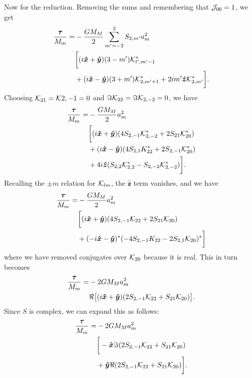 \documentclass[aps,twocolumn,secnumarabic,balancelastpage,amsmath,amssymb,nofootinbib,floatfix]{revtex4-1}
\begin{document}
Now for the reduction. Removing the sums and remembering that $\mathcal{J}_{00}=1$, we get
\begin{equation*}
\begin{aligned}
\frac{\bm \tau}{M_m} = &-\frac{GM_M}{2} \sum_{m'=-2}^2 S_{2,m'}a_m^2\\
&\bigg[(i\bm{\hat x} + \bm{\hat y})(3-m')\mathcal{K}^*_{l',m'-1}\\
&+(i\bm{\hat x}-\bm{\hat y})(3+m')\mathcal{K}^*_{2,m'+1}+2im'\bm{\hat z} \mathcal{K}^*_{2,m'}\bigg].
\end{aligned}
\end{equation*}
Choosing $\mathcal{K}_{21}=\mathcal{K}{2,-1}=0$ and $\Im \mathcal{K}_{22}=\Im \mathcal{K}_{2,-2}=0$, we have
\begin{equation*}
\begin{aligned}
\frac{\bm \tau}{M_m} = &-\frac{GM_M}{2} a_m^2\\
&\bigg[(i\bm{\hat x} + \bm{\hat y})(4S_{2,-1}\mathcal{K}^*_{2,-2}+2S_{21}\mathcal{K}^*_{20})\\
&+(i\bm{\hat x}-\bm{\hat y})(4S_{2,1}K^*_{22}+2S_{2,-1}\mathcal{K}^*_{20})\\
&+4i\bm{\hat z} (S_{2,2}\mathcal{K}^*_{2,2}-S_{2,-2}\mathcal{K}^*_{2,-2})\bigg].
\end{aligned}
\end{equation*}
Recalling the $\pm m$ relation for $\mathcal{K}_{lm}$, the $\bm{\hat z}$ term vanishes, and we have
\begin{equation*}
\begin{aligned}
\frac{\bm \tau}{M_m} = &-\frac{GM_M}{2}a_m^2\\
&\bigg[(i\bm{\hat x} + \bm{\hat y})(4S_{2,-1}\mathcal{K}_{22}+2S_{21}\mathcal{K}_{20})\\
&+(-i\bm{\hat x}-\bm{\hat y})^*(-4S_{2,-1}K_{22}-2S_{2,1}\mathcal{K}_{20})^*\bigg]
\end{aligned}
\end{equation*}
where we have removed conjugates over $\mathcal{K}_{20}$ because it is real. This in turn becomes
\begin{equation*}
\begin{aligned}
\frac{\bm \tau}{M_m} = &-2GM_M a_m^2\\
&\Re\big[(i\bm{\hat x} + \bm{\hat y})(2S_{2,-1}\mathcal{K}_{22}+S_{21}\mathcal{K}_{20})\big].
\end{aligned}
\end{equation*}
Since $S$ is complex, we can expand this as follows:
\begin{equation*}
\begin{aligned}
\frac{\bm \tau}{M_m} = &-2GM_M  a_m^2\\
&\bigg[-\bm{\hat x}\Im(2S_{2,-1}\mathcal{K}_{22}+S_{21}\mathcal{K}_{20})\\
&+\bm{\hat y}\Re(2S_{2,-1}\mathcal{K}_{22}+S_{21}\mathcal{K}_{20})\bigg].
\end{aligned}
\end{equation*}
\end{document}
